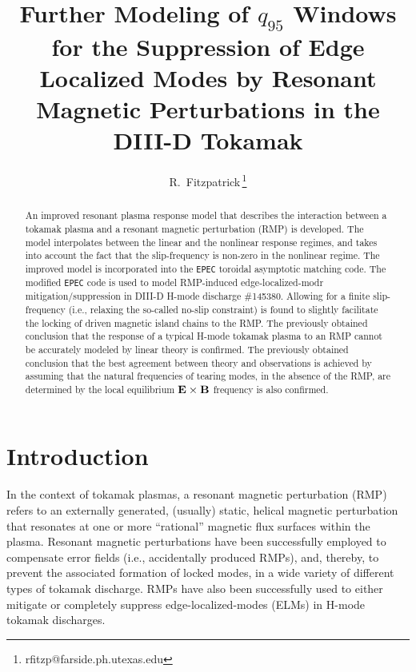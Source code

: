 \documentclass[12pt,prb,aps]{revtex4-1}
\begin{document}
\title {Further Modeling of $q_{95}$ Windows for the Suppression of Edge Localized Modes by Resonant Magnetic Perturbations in the DIII-D Tokamak}

\author{R.~Fitzpatrick\,\footnote{rfitzp@farside.ph.utexas.edu}}

\begin{abstract}
An improved resonant plasma response model that describes the interaction between a tokamak plasma and a resonant magnetic perturbation  (RMP) is developed. 
The model interpolates between the linear and the nonlinear response regimes, and takes into account the fact that the slip-frequency
is non-zero in the nonlinear regime. The improved model is incorporated into the {\tt EPEC} toroidal asymptotic matching code.
The modified {\tt EPEC} code is used to model RMP-induced edge-localized-modr mitigation/suppression in DIII-D H-mode discharge \#145380. 
Allowing for a finite slip-frequency (i.e., relaxing the so-called no-slip constraint) is found to slightly facilitate the locking of
driven magnetic island chains to the RMP. The previously obtained conclusion 
that the response of a typical H-mode tokamak plasma to an RMP cannot be accurately modeled by linear theory is confirmed. The previously obtained conclusion that the best agreement between theory and observations is achieved by assuming that the
natural frequencies of tearing modes, in the absence of the RMP, are determined by the local equilibrium ${\bf E}\times{\bf B}$ frequency is also confirmed.
\end{abstract}

\maketitle

\section{Introduction}
In the context of tokamak plasmas, a resonant magnetic perturbation (RMP) refers to an externally
generated, (usually) static, helical magnetic perturbation that resonates at
one or more ``rational'' magnetic flux surfaces within the plasma. Resonant magnetic perturbations have been successfully
employed to compensate error fields (i.e., accidentally produced RMPs), and, thereby,  to prevent the associated formation of
locked modes, in a wide variety of different types of tokamak discharge. \cite{error1,error2,error3} RMPs have also been  successfully used to either  
mitigate or completely suppress  edge-localized-modes (ELMs) in H-mode tokamak discharges.\cite{elm1,elm2,elm3,elm4,elm5,elm6}
\end{document}
